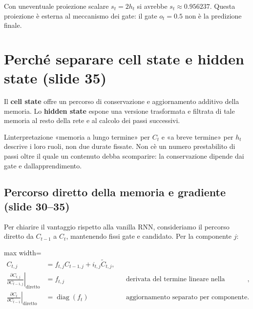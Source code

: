 \documentclass[11pt,a4paper,oneside,openany]{book}
\begin{document}
Con un\textquotesingle eventuale proiezione scalare \(s_t=2h_t\) si avrebbe \(s_t\approx0.956237\). Questa proiezione è esterna al meccanismo dei gate: il gate \(o_t=0.5\) non è la predizione finale.

\section{Perché separare cell state e hidden state (slide 35)}\label{f03-r838}

Il \textbf{cell state} offre un percorso di conservazione e aggiornamento additivo della memoria. Lo \textbf{hidden state} espone una versione trasformata e filtrata di tale memoria al resto della rete e al calcolo dei passi successivi.

L\textquotesingle interpretazione «memoria a lungo termine» per \(C_t\) e «a breve termine» per \(h_t\) descrive i loro ruoli, non due durate fissate. Non c\textquotesingle è un numero prestabilito di passi oltre il quale un contenuto debba scomparire: la conservazione dipende dai gate e dall\textquotesingle apprendimento.

\subsection{Percorso diretto della memoria e gradiente (slide 30--35)}\label{f03-r844}

Per chiarire il vantaggio rispetto alla vanilla RNN, consideriamo il percorso diretto da \(C_{t-1}\) a \(C_t\), mantenendo fissi gate e candidato. Per la componente \(j\):

\begin{center}
\begin{adjustbox}{max width=\linewidth}
$\displaystyle 
\begin{aligned}
C_{t,j}&=f_{t,j}C_{t-1,j}+i_{t,j}\widetilde C_{t,j},\\
\left.\frac{\partial C_{t,j}}{\partial C_{t-1,j}}\right|_{\mathrm{diretto}}
&=f_{t,j}
&&\text{derivata del termine lineare nella memoria},\\
\left.\frac{\partial C_t}{\partial C_{t-1}}\right|_{\mathrm{diretto}}
&=\operatorname{diag}(f_t)
&&\text{aggiornamento separato per componente}.
\end{aligned}
$
\end{adjustbox}
\end{center}
\end{document}
